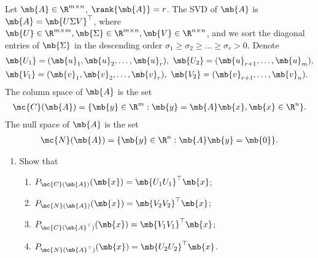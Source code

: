 \begin{exercise}
    Let $\mb{A}\in\R^{m\times n}$, $\rank{\mb{A}}=r$. The SVD of $\mb{A}$ is $\mb{A}=\mb{U\Sigma V}^{\top}$, where $\mb{U}\in \R^{m\times m},\mb{\Sigma}\in\R^{m\times n}, \mb{V}\in\R^{n\times n}$, and we sort the diagonal entries of $\mb{\Sigma}$ in the descending order $\sigma_1\geq\sigma_2\geq\ldots\geq\sigma_r>0$. Denote
    \begin{align*}
         & \mb{U_1}=(\mb{u}_{1},\mb{u}_{2},\ldots,\mb{u}_{r}),\  \mb{U_2}=(\mb{u}_{r+1},\ldots,\mb{u}_{m}), \\
         & \mb{V_1}=(\mb{v}_{1},\mb{v}_{2},\ldots,\mb{v}_{r}),\  \mb{V_2}=(\mb{v}_{r+1},\ldots,\mb{v}_{n}).
    \end{align*}
    The column space of $\mb{A}$ is the set
    \begin{align*}
        \mc{C}(\mb{A}) = \{\mb{y}\in\R^m: \mb{y}=\mb{A}\mb{x}, \mb{x}\in\R^n\}.
    \end{align*}
    The null space of $\mb{A}$ is the set
    \begin{align*}
        \mc{N}(\mb{A})=\{\mb{y}\in\R^n: \mb{A}\mb{y}=\mb{0}\}.
    \end{align*}

    \begin{enumerate}
        \item Show that
            \begin{enumerate}
                \item $P_{\mc{C}(\mb{A})}(\mb{x})=\mb{U_1U_1}^{\top}\mb{x}$;
                \item $P_{\mc{N}(\mb{A})}(\mb{x})=\mb{V_2V_2}^{\top}\mb{x}$;
                \item $P_{\mc{C}(\mb{A}^{\top})}(\mb{x})=\mb{V_1V_1}^{\top}\mb{x}$;
                \item $P_{\mc{N}(\mb{A}^{\top})}(\mb{x})=\mb{U_2U_2}^{\top}\mb{x}$.
            \end{enumerate}


\end{enumerate}
\end{exercise}

